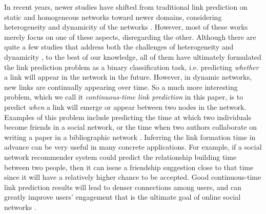 In recent years, newer studies have shifted from traditional link prediction on static and homogeneous networks toward newer domains, considering heterogeneity and dynamicity of the networks \cite{dong2012link, davis2011multi, 7752228, hajibagheri2016leveraging, moradabadi2017novel}. However, most of these works merely focus on one of these aspects, disregarding the other. Although there are quite a few studies that address both the challenges of heterogeneity and dynamicity \cite{aggarwal2012dynamic, sett2017temporal}, to the best of our knowledge, all of them have ultimately formulated the link prediction problem as a binary classification task, i.e. predicting \emph{whether} a link will appear in the network in the future. However, in dynamic networks, new links are continually appearing over time. So a much more interesting problem, which we call it \emph{continuous-time link prediction} in this paper, is to predict \emph{when} a link will emerge or appear between two nodes in the network. Examples of this problem include predicting the time at which two individuals become friends in a social network, or the time when two authors collaborate on writing a paper in a bibliographic network \cite{sun2012will}. Inferring the link formation time in advance can be very useful in many concrete applications. For example, if a social network recommender system could predict the relationship building time between two people, then it can issue a friendship suggestion close to that time since it will have a relatively higher chance to be accepted. Good continuous-time link prediction results will lead to denser connections among users, and can greatly improve users' engagement that is the ultimate goal of online social networks \cite{kwak2010twitter}.

